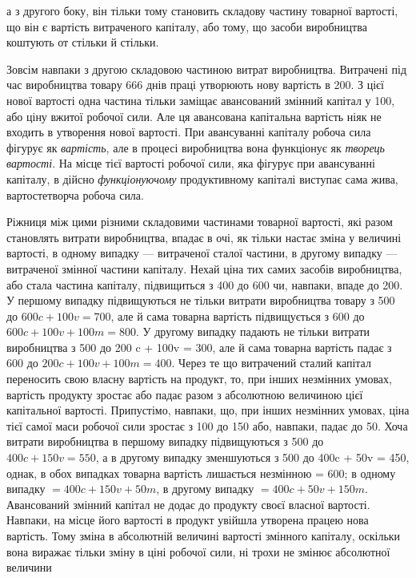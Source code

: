 \parcont{}  %
а з другого боку, він тільки тому становить складову частину
товарної вартості, що він є вартість витраченого капіталу, або
тому, що засоби виробництва коштують от стільки й стільки.

Зовсім навпаки з другою складовою частиною витрат виробництва.
Витрачені під час виробництва товару 666 днів
праці утворюють нову вартість в 200. З цієї
нової вартості одна частина тільки заміщає авансований змінний
капітал у 100, або ціну вжитої робочої сили.
Але ця авансована капітальна вартість ніяк не входить в утворення
нової вартості. При авансуванні капіталу робоча сила
фігурує як \emph{вартість}, але в процесі виробництва вона функціонує
як \emph{творець вартості}. На місце тієї вартості робочої сили,
яка фігурує при авансуванні капіталу, в дійсно \emph{функціонуючому}
продуктивному капіталі виступає сама жива, вартостетворча робоча
сила.

Ріжниця між цими різними складовими частинами товарної
вартості, які разом становлять витрати виробництва, впадає
в очі, як тільки настає зміна у величині вартості, в одному випадку
— витраченої сталої частини, в другому випадку — витраченої
змінної частини капіталу. Нехай ціна тих самих засобів виробництва,
або стала частина капіталу, підвищиться з 400 до 600 чи, навпаки, впаде до
200. У першому випадку підвищуються не
тільки витрати виробництва товару з 500 до
$600 c + 100v = 700$, але й сама товарна вартість
підвищується з 600 до $600 c + 100 v + 100 m = 800$.
У другому випадку падають не тільки витрати виробництва з 500 до 200 c + 100v =
300, але й сама товарна вартість падає з
600 до $200c + 100v + 100m = 400$.
Через те що витрачений сталий капітал переносить свою
власну вартість на продукт, то, при інших незмінних умовах, вартість
продукту зростає або падає разом з абсолютною величиною
цієї капітальної вартості. Припустімо, навпаки, що, при
інших незмінних умовах, ціна тієї самої маси робочої сили зростає
з 100 до 150 або,
навпаки, падає до 50. Хоча витрати виробництва
в першому випадку підвищуються з 500
до $400 c + 150 v = 550$, а в другому випадку
зменшуються з 500 до 400c + 50v = 450, однак, в обох випадках товарна вартість лишається
незмінною = 600; в одному випадку
$= 400c + 150v + 50 m$, в другому випадку $= 400c + 50v + 150m$.
Авансований змінний капітал не додає до продукту своєї власної
вартості. Навпаки, на місце його вартості в продукт увійшла утворена
працею нова вартість. Тому зміна в абсолютній величині
вартості змінного капіталу, оскільки вона виражає тільки зміну
в ціні робочої сили, ні трохи не змінює абсолютної величини
\parbreak{}  %

